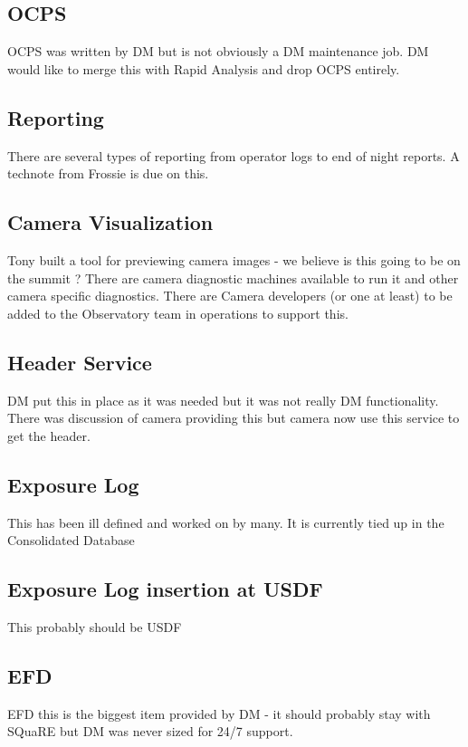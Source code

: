 \subsection{ \gls{OCPS} }
\gls{OCPS}   was  written by \gls{DM} but is  not obviously a \gls{DM} maintenance job.
DM would like to merge this with Rapid Analysis and drop OCPS entirely.

\subsection{ Reporting }

There are several types of reporting from operator logs to end of night reports.
A technote from Frossie is due on this.

\subsection{ \gls{Camera} Visualization}
Tony built a tool for previewing camera images - we believe is this going to be on the summit ?
There are camera diagnostic machines available to run it and other camera specific diagnostics.
There are Camera developers (or one at least) to be added to the Observatory team in operations to support this.


\subsection{ Header Service }
 \gls{DM} put this in place as it was  needed but it was not really \gls{DM} functionality.
There was discussion of camera providing this but camera now use this service to get the header.

\subsection{ Exposure Log}
This has been ill defined and worked on by many.
It is currently tied up in the Consolidated Database 

\subsection{ Exposure Log  insertion at \gls{USDF}}
  This probably  should be \gls{USDF}

\subsection{ \gls{EFD}}
 EFD this is the biggest item provided by \gls{DM} - it should probably stay with SQuaRE but \gls{DM} was never sized for 24/7 support.

